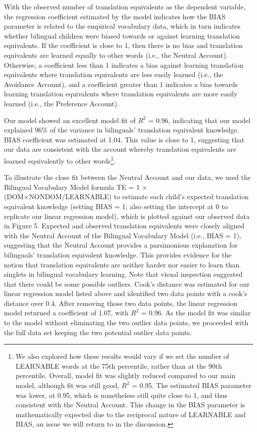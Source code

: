 \documentclass[
  english,
  ,man,floatsintext]{apa6}
\begin{document}
With the observed number of translation equivalents as the dependent variable, the regression coefficient estimated by the model indicates how the BIAS parameter is related to the empirical vocabulary data, which in turn indicates whether bilingual children were biased towards or against learning translation equivalents. If the coefficient is close to 1, then there is no bias and translation equivalents are learned equally to other words (i.e., the Neutral Account). Otherwise, a coefficient less than 1 indicates a bias against learning translation equivalents where translation equivalents are less easily learned (i.e., the Avoidance Account), and a coefficient greater than 1 indicates a bias towards learning translation equivalents where translation equivalents are more easily learned (i.e., the Preference Account).

Our model showed an excellent model fit of \(R^2\) = 0.96, indicating that our model explained 96\% of the variance in bilinguals' translation equivalent knowledge. BIAS coefficient was estimated at 1.04. This value is close to 1, suggesting that our data are consistent with the account whereby translation equivalents are learned equivalently to other words\footnote{We also explored how these results would vary if we set the number of LEARNABLE words at the 75th percentile, rather than at the 90th percentile. Overall, model fit was slightly reduced compared to our main model, although fit was still good, \(R^2\) = 0.95. The estimated BIAS parameter was lower, at 0.95, which is nonetheless still quite close to 1, and thus consistent with the Neutral Account. This change in the BIAS parameter is mathematically expected due to the reciprocal nature of LEARNABLE and BIAS, an issue we will return to in the discussion.}.

To illustrate the close fit between the Neutral Account and our data, we used the Bilingual Vocabulary Model formula TE = 1 × (DOM×NONDOM/LEARNABLE) to estimate each child's expected translation equivalent knowledge (setting BIAS = 1; also setting the intercept at 0 to replicate our linear regression model), which is plotted against our observed data in Figure 5. Expected and observed translation equivalents were closely aligned with the Neutral Account of the Bilingual Vocabulary Model (i.e., BIAS = 1), suggesting that the Neutral Account provides a parsimonious explanation for bilinguals' translation equivalent knowledge. This provides evidence for the notion that translation equivalents are neither harder nor easier to learn than singlets in bilingual vocabulary learning. Note that visual inspection suggested that there could be some possible outliers. Cook's distance was estimated for our linear regression model listed above and identified two data points with a cook's distance over 0.4. After removing those two data points, the linear regression model returned a coefficient of 1.07, with \(R^2\) = 0.96. As the model fit was similar to the model without eliminating the two outlier data points, we proceeded with the full data set keeping the two potential outlier data points.
\end{document}
